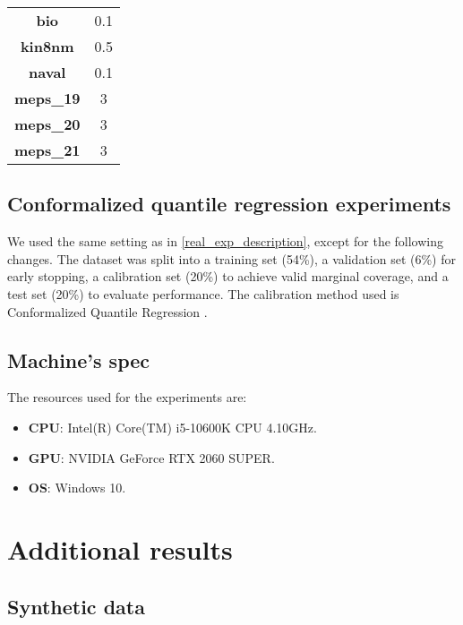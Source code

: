 \documentclass{article}
\begin{document}
\begin{appendices}
\begin{table}[!htb]
\begin{minipage}{.65\linewidth}
{\begin{tabular}{cc}
    \textbf{bio} & 0.1 \\

    \textbf{kin8nm} & 0.5 \\

    \textbf{naval} & 0.1 \\

    \textbf{meps\_19} & 3 \\

    \textbf{meps\_20} & 3 \\

    \textbf{meps\_21} & 3 \\
    \bottomrule[1.1pt]
    \end{tabular}%
    }
    \end{minipage} 
    
\end{table}


\subsection{Conformalized quantile regression experiments}\label{cqr_exp}
We used the same setting as in \ref{real_exp_description}, except for the following changes.
The dataset was split into a training set (54\%), a validation set (6\%) for early stopping, a calibration set (20\%) to achieve valid marginal coverage, and a test set (20\%) to evaluate performance. 
The calibration method used is Conformalized Quantile Regression \cite{CQR}.

\subsection{Machine's spec}\label{sec:exp_spec}

The resources used for the experiments are:

\begin{itemize}
    \item \textbf{CPU}: Intel(R) Core(TM) i5-10600K CPU 4.10GHz.
    \item \textbf{GPU}: NVIDIA GeForce RTX 2060 SUPER.
    \item \textbf{OS}: Windows 10.

\end{itemize}


\section{Additional results}

\subsection{Synthetic data}\label{syn_int_results}


\end{appendices}
\end{document}
